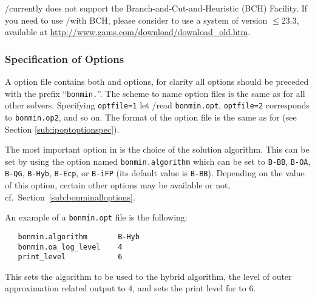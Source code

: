 \MYGAMS/\BONMIN currently does not support the \MYGAMS Branch-and-Cut-and-Heuristic (BCH) Facility.
If you need to use \MYGAMS/\BONMIN with BCH, please consider to use a \MYGAMS system of version $\leq 23.3$, available at \url{http://www.gams.com/download/download_old.htm}.

\subsubsection{Specification of Options}

A \BONMIN option file contains both \IPOPT and \BONMIN options, for clarity all \BONMIN options should be preceded with the prefix ``\texttt{bonmin.}''. %
The scheme to name option files is the same as for all other \MYGAMS solvers.
Specifying \texttt{optfile=1} let \MYGAMS/\BONMIN read \texttt{bonmin.opt}, \texttt{optfile=2} corresponds to \texttt{bonmin.op2}, and so on.
The format of the option file is the same as for \IPOPT (see Section \ref{sub:ipoptoptionspec}).

The most important option in \BONMIN is the choice of the solution algorithm.
This can be set by using the option named \texttt{bonmin.algorithm} which can be set to \texttt{B-BB}, \texttt{B-OA}, \texttt{B-QG}, \texttt{B-Hyb}, \texttt{B-Ecp}, or \texttt{B-iFP} (its default value is \texttt{B-BB}).
Depending on the value of this option, certain other options may be available or not, cf.\ Section~\ref{sub:bonminalloptions}.

An example of a \texttt{bonmin.opt} file is the following:
\begin{verbatim}
   bonmin.algorithm       B-Hyb
   bonmin.oa_log_level    4
   print_level            6
\end{verbatim}
This sets the algorithm to be used to the hybrid algorithm, the level of outer approximation related output to $4$, 
and sets the print level for \IPOPT to $6$.

